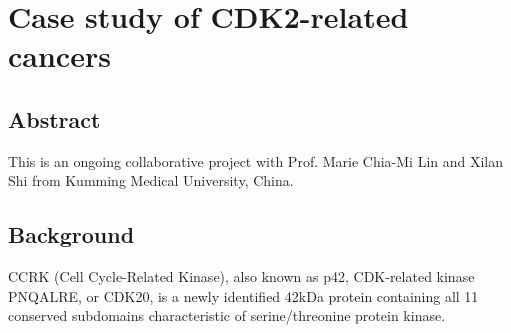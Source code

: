 \chapter{Case study of CDK2-related cancers}
\label{cdk2}

\section{Abstract}

This is an ongoing collaborative project with Prof. Marie Chia-Mi Lin and Xilan Shi from Kumming Medical University, China.

\section{Background}




CCRK (Cell Cycle-Related Kinase), also known as p42, CDK-related kinase PNQALRE, or CDK20, is a newly identified 42kDa protein containing all 11 conserved subdomains characteristic of serine/threonine protein kinase.


